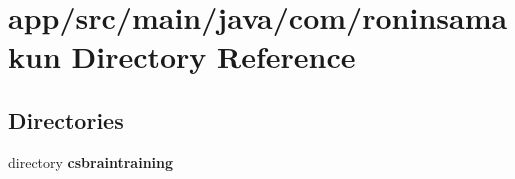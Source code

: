 \section{app/src/main/java/com/roninsamakun Directory Reference}
\label{dir_6730e48dd38787021aa4fb824e7ba327}
\subsection*{Directories}
\begin{DoxyCompactItemize}
\item 
directory {\bf csbraintraining}
\end{DoxyCompactItemize}
